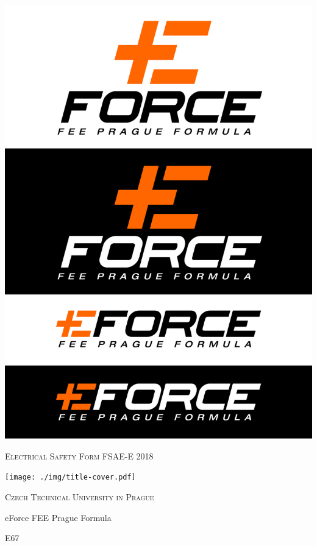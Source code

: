 	\centering	
\includegraphics[width=\textwidth, trim={0cm 6cm 0cm 20cm}, clip]{./img/title-logo.pdf}
\vspace{.5cm}
{\scshape\huge Electrical Safety Form FSAE-E 2018 \par}
\vspace{.5cm}
\texttt{[image: ./img/title-cover.pdf]}	
\vspace{.5cm}
{\scshape\Large Czech Technical University in Prague\par}
\vspace{.5cm}
{\LARGE eForce FEE Prague Formula\par}
\vspace{.9cm}
{\LARGE E67\par}
\vspace{.6cm}

